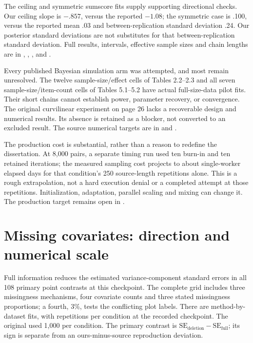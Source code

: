 The ceiling and symmetric sumscore fits supply supporting directional checks. Our ceiling slope is $-.857$, versus the reported $-1.08$; the symmetric case is .100, versus the reported mean .03 and between-replication standard deviation .24. Our posterior standard deviations are not substitutes for that between-replication standard deviation. Full results, intervals, effective sample sizes and chain lengths are in , , , and .

Every published Bayesian simulation arm was attempted, and most remain unresolved. The twelve sample-size/effect cells of Tables 2.2--2.3 and all seven sample-size/item-count cells of Tables 5.1--5.2 have actual full-size-data pilot fits. Their short chains cannot establish power, parameter recovery, or convergence. The original curvilinear experiment on page 26 lacks a recoverable design and numerical results. Its absence is retained as a blocker, not converted to an excluded result. The source numerical targets are in  and .

The production cost is substantial, rather than a reason to redefine the dissertation. At 8,000 pairs, a separate timing run used ten burn-in and ten retained iterations; the measured sampling cost projects to about \CostDays{} single-worker elapsed days for that condition's 250 source-length repetitions alone. This is a rough extrapolation, not a hard execution denial or a completed attempt at those repetitions. Initialization, adaptation, parallel scaling and mixing can change it. The production target remains open in .

\section{Missing covariates: direction and numerical scale}
Full information reduces the estimated variance-component standard errors in all 108 primary point contrasts at this checkpoint. The complete grid includes three missingness mechanisms, four covariate counts and three stated missingness proportions; a fourth, 3\%, tests the conflicting plot labels. There are \Trials{} method-by-dataset fits, with \MinRep{} repetitions per condition at the recorded checkpoint. The original used 1,000 per condition. The primary contrast is $\mathrm{SE}_{\mathrm{deletion}}-\mathrm{SE}_{\mathrm{full}}$; its sign is separate from an ours-minus-source reproduction deviation.

